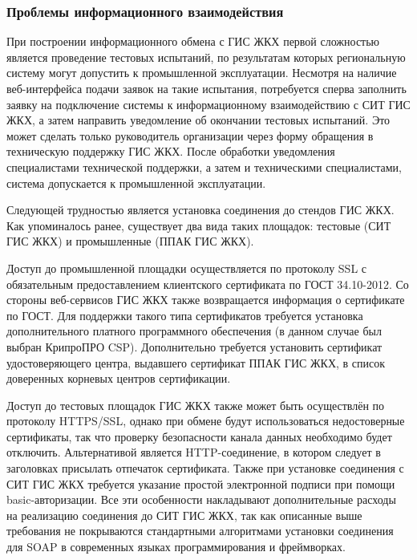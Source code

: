 
\subsubsection{Проблемы информационного взаимодействия}

При построении информационного обмена с ГИС ЖКХ первой сложностью является проведение тестовых испытаний, по результатам которых региональную систему могут допустить к промышленной эксплуатации.
Несмотря на наличие веб-интерфейса подачи заявок на такие испытания, потребуется сперва заполнить заявку на подключение системы к информационному взаимодействию с СИТ ГИС ЖКХ, а затем направить уведомление об окончании тестовых испытаний.
Это может сделать только руководитель организации через форму обращения в техническую поддержку ГИС ЖКХ.
После обработки уведомления специалистами технической поддержки, а затем и техническими специалистами, система допускается к промышленной эксплуатации.

Следующей трудностью является установка соединения до стендов ГИС ЖКХ.
Как упоминалось ранее, существует два вида таких площадок: тестовые (СИТ ГИС ЖКХ) и промышленные (ППАК ГИС ЖКХ).

Доступ до промышленной площадки осуществляется по протоколу SSL с обязательным предоставлением клиентского сертификата по ГОСТ 34.10-2012.
Со стороны веб-сервисов ГИС ЖКХ также возвращается информация о сертификате по ГОСТ.
Для поддержки такого типа сертификатов требуется установка дополнительного платного программного обеспечения (в данном случае был выбран КрипроПРО CSP).
Дополнительно требуется установить сертификат удостоверяющего центра, выдавшего сертификат ППАК ГИС ЖКХ, в список доверенных корневых центров сертификации.

Доступ до тестовых площадок ГИС ЖКХ также может быть осуществлён по протоколу HTTPS/SSL, однако при обмене будут использоваться недостоверные сертификаты, так что проверку безопасности канала данных необходимо будет отключить.
Альтернативой является HTTP-соединение, в котором следует в заголовках присылать отпечаток сертификата.
Также при установке соединения с СИТ ГИС ЖКХ требуется указание простой электронной подписи при помощи basic-авторизации.
Все эти особенности накладывают дополнительные расходы на реализацию соединения до СИТ ГИС ЖКХ, так как описанные выше требования не покрываются стандартными алгоритмами установки соединения для SOAP в современных языках программирования и фреймворках.

